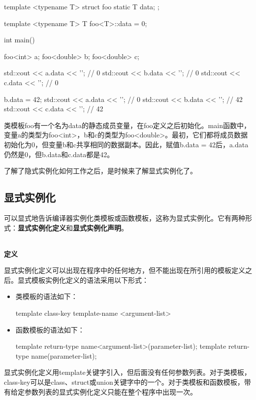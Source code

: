 \begin{cpp}
template <typename T>
struct foo
{
	static T data;
};

template <typename T> T foo<T>::data = 0;

int main()
{
	foo<int> a;
	foo<double> b;
	foo<double> c;
	
	std::cout << a.data << '\n'; // 0
	std::cout << b.data << '\n'; // 0
	std::cout << c.data << '\n'; // 0
	
	b.data = 42;
	std::cout << a.data << '\n'; // 0
	std::cout << b.data << '\n'; // 42
	std::cout << c.data << '\n'; // 42
}
\end{cpp}

类模板foo有一个名为data的静态成员变量，在foo定义之后初始化。main函数中，变量a的类型为foo<int>，b和c的类型为foo<double>。最初，它们都将成员数据初始化为0，但变量b和c共享相同的数据副本。因此，赋值b.data = 42后，a.data仍然是0，但b.data和c.data都是42。

了解了隐式实例化如何工作之后，是时候来了解显式实例化了。

\subsection{显式实例化}

可以显式地告诉编译器实例化类模板或函数模板，这称为显式实例化。它有两种形式：\textbf{显式实例化定义}和\textbf{显式实例化声明}。


\hspace*{\fill} \\ %
\noindent\textbf{定义}

显式实例化定义可以出现在程序中的任何地方，但不能出现在所引用的模板定义之后。显式模板实例化定义的语法采用以下形式：

\begin{itemize}
\item 
类模板的语法如下：
\begin{cpp}
template class-key template-name <argument-list>
\end{cpp}

\item 
函数模板的语法如下：
\begin{cpp}
template return-type name<argument-list>(parameter-list);
template return-type name(parameter-list);
\end{cpp}
\end{itemize}

显式实例化定义用template关键字引入，但后面没有任何参数列表。对于类模板，class-key可以是class、struct或union关键字中的一个。对于类模板和函数模板，带有给定参数列表的显式实例化定义只能在整个程序中出现一次。

